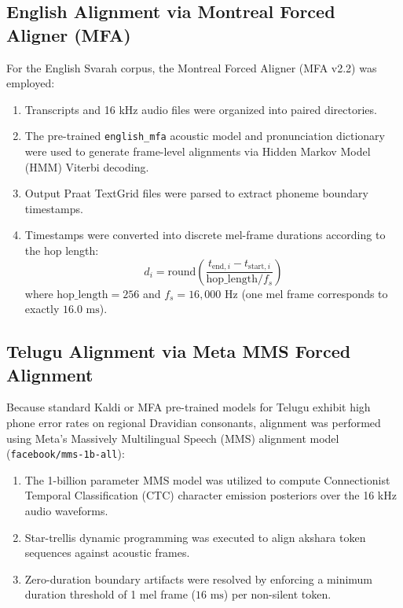 \documentclass[11pt,a4paper]{article}
\begin{document}
\subsection{English Alignment via Montreal Forced Aligner (MFA)}
For the English Svarah corpus, the Montreal Forced Aligner (MFA v2.2) was employed:
\begin{enumerate}
    \item Transcripts and 16 kHz audio files were organized into paired directories.
    \item The pre-trained \texttt{english\_mfa} acoustic model and pronunciation dictionary were used to generate frame-level alignments via Hidden Markov Model (HMM) Viterbi decoding.
    \item Output Praat TextGrid files were parsed to extract phoneme boundary timestamps.
    \item Timestamps were converted into discrete mel-frame durations according to the hop length:
    \begin{equation}
        d_i = \mathrm{round}\left(\frac{t_{\text{end}, i} - t_{\text{start}, i}}{\text{hop\_length} / f_s}\right)
    \end{equation}
    where $\text{hop\_length} = 256$ and $f_s = 16,000\text{ Hz}$ (one mel frame corresponds to exactly $16.0\text{ ms}$).
\end{enumerate}

\subsection{Telugu Alignment via Meta MMS Forced Alignment}
Because standard Kaldi or MFA pre-trained models for Telugu exhibit high phone error rates on regional Dravidian consonants, alignment was performed using Meta's Massively Multilingual Speech (MMS) alignment model (\texttt{facebook/mms-1b-all}):
\begin{enumerate}
    \item The 1-billion parameter MMS model was utilized to compute Connectionist Temporal Classification (CTC) character emission posteriors over the 16 kHz audio waveforms.
    \item Star-trellis dynamic programming was executed to align akshara token sequences against acoustic frames.
    \item Zero-duration boundary artifacts were resolved by enforcing a minimum duration threshold of 1 mel frame ($16\text{ ms}$) per non-silent token.
\end{enumerate}
\end{document}
